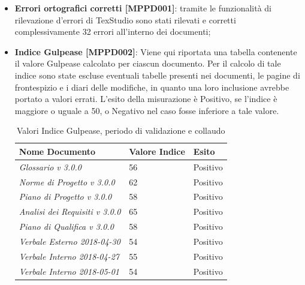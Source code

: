 \documentclass[openany,12pt,a4paper]{report}
\begin{document}
\begin{itemize}
	\item \textbf{Errori ortografici corretti [MPPD001]}: tramite le funzionalità di rilevazione d'errori di TexStudio sono stati rilevati e corretti complessivamente 32 errori all'interno dei documenti;
	
	\item \textbf{Indice Gulpease [MPPD002]}: Viene qui riportata una tabella contenente il valore Gulpease calcolato per ciascun documento.
	Per il calcolo di tale indice sono state escluse eventuali tabelle presenti nei documenti, le pagine di frontespizio e i diari delle modifiche, in quanto una loro inclusione avrebbe portato a valori errati. L'esito della misurazione è Positivo, se l'indice è maggiore o uguale a 50, o Negativo nel caso fosse inferiore a tale valore.
	
	\begin{table}[h]
		\begin{center}
			\setlength\LTleft{6mm}
			\begin{longtable}{|p{60mm}|p{30mm}|p{25mm}|}
				\hline  
				\textbf{Nome Documento} & \textbf{Valore Indice} & \textbf{Esito} \\ \hline    
				\textit{Glossario v 3.0.0} & 56 & Positivo\\ \hline    
				\textit{Norme di Progetto v 3.0.0} & 62 & Positivo\\ \hline    
				\textit{Piano di Progetto v 3.0.0} & 58 & Positivo\\ \hline    
				\textit{Analisi dei Requisiti v 3.0.0} & 65 & Positivo\\ \hline    
				\textit{Piano di Qualifica v 3.0.0} & 58 & Positivo\\ \hline    
				\textit{Verbale Esterno 2018-04-30} & 54 & Positivo\\ \hline
				\textit{Verbale Interno 2018-04-27} & 55 & Positivo\\ \hline
				\textit{Verbale Interno 2018-05-01} & 54 & Positivo\\ \hline
			\end{longtable}
		\end{center}
		\caption{Valori Indice Gulpease, periodo di validazione e collaudo} 
	\end{table} 
	

\end{itemize}
\end{document}
